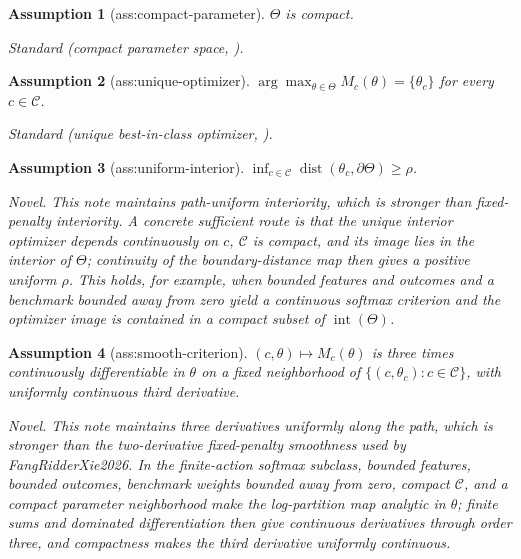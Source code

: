 \documentclass{article}
\newtheorem{assumption}{Assumption}
\begin{document}
\begin{assumption}[ass:compact-parameter]\label{ass:compact-parameter}
\(\Theta\) is compact.
\par\smallskip\noindent\emph{Standard} (compact parameter space, \cite{FangRidderXie2026}).
\end{assumption}

\begin{assumption}[ass:unique-optimizer]\label{ass:unique-optimizer}
\(\arg\max_{\theta\in\Theta}M_c(\theta)=\{\theta_c\}\) for every \(c\in\mathcal C\).
\par\smallskip\noindent\emph{Standard} (unique best-in-class optimizer, \cite{FangRidderXie2026}).
\end{assumption}

\begin{assumption}[ass:uniform-interior]\label{ass:uniform-interior}
\(\inf_{c\in\mathcal C}\operatorname{dist}(\theta_c,\partial\Theta)\ge\rho\).
\par\smallskip\noindent\emph{Novel.} This note maintains path-uniform interiority, which is stronger than fixed-penalty interiority. A concrete sufficient route is that the unique interior optimizer depends continuously on \(c\), \(\mathcal C\) is compact, and its image lies in the interior of \(\Theta\); continuity of the boundary-distance map then gives a positive uniform \(\rho\). This holds, for example, when bounded features and outcomes and a benchmark bounded away from zero yield a continuous softmax criterion and the optimizer image is contained in a compact subset of \(\operatorname{int}(\Theta)\).
\end{assumption}

\begin{assumption}[ass:smooth-criterion]\label{ass:smooth-criterion}
\((c,\theta)\mapsto M_c(\theta)\) is three times continuously differentiable in \(\theta\) on a fixed neighborhood of \(\{(c,\theta_c):c\in\mathcal C\}\), with uniformly continuous third derivative.
\par\smallskip\noindent\emph{Novel.} This note maintains three derivatives uniformly along the path, which is stronger than the two-derivative fixed-penalty smoothness used by FangRidderXie2026. In the finite-action softmax subclass, bounded features, bounded outcomes, benchmark weights bounded away from zero, compact \(\mathcal C\), and a compact parameter neighborhood make the log-partition map analytic in \(\theta\); finite sums and dominated differentiation then give continuous derivatives through order three, and compactness makes the third derivative uniformly continuous.
\end{assumption}
\end{document}
